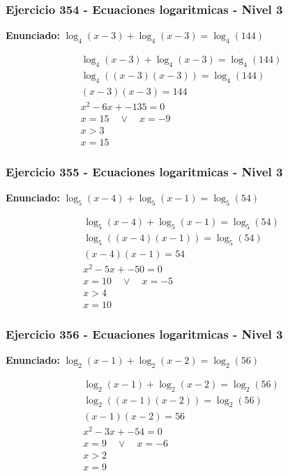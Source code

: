 \documentclass[12pt,a4paper]{article}
\begin{document}
\subsubsection*{Ejercicio 354 - Ecuaciones logaritmicas - Nivel 3}
\textbf{Enunciado:} \(\log_{4}\left(x-3\right)+\log_{4}\left(x-3\right)=\log_{4}\left(144\right)\)

\[
\begin{aligned}
\log_{4}\left(x-3\right)+\log_{4}\left(x-3\right)=\log_{4}\left(144\right)\\
\log_{4}\left((x-3)(x-3)\right)=\log_{4}\left(144\right)\\
(x-3)(x-3)=144\\
x^2-6x+-135=0\\
x=15\quad \vee\quad x=-9\\
x>3\\
\boxed{x=15}
\end{aligned}
\]


\subsubsection*{Ejercicio 355 - Ecuaciones logaritmicas - Nivel 3}
\textbf{Enunciado:} \(\log_{5}\left(x-4\right)+\log_{5}\left(x-1\right)=\log_{5}\left(54\right)\)

\[
\begin{aligned}
\log_{5}\left(x-4\right)+\log_{5}\left(x-1\right)=\log_{5}\left(54\right)\\
\log_{5}\left((x-4)(x-1)\right)=\log_{5}\left(54\right)\\
(x-4)(x-1)=54\\
x^2-5x+-50=0\\
x=10\quad \vee\quad x=-5\\
x>4\\
\boxed{x=10}
\end{aligned}
\]


\subsubsection*{Ejercicio 356 - Ecuaciones logaritmicas - Nivel 3}
\textbf{Enunciado:} \(\log_{2}\left(x-1\right)+\log_{2}\left(x-2\right)=\log_{2}\left(56\right)\)

\[
\begin{aligned}
\log_{2}\left(x-1\right)+\log_{2}\left(x-2\right)=\log_{2}\left(56\right)\\
\log_{2}\left((x-1)(x-2)\right)=\log_{2}\left(56\right)\\
(x-1)(x-2)=56\\
x^2-3x+-54=0\\
x=9\quad \vee\quad x=-6\\
x>2\\
\boxed{x=9}
\end{aligned}
\]
\end{document}
